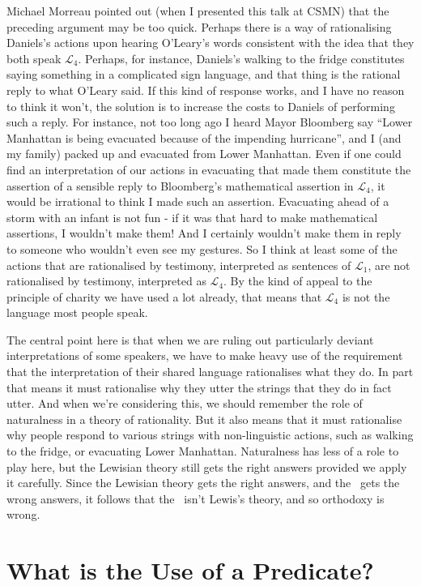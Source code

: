 Michael Morreau pointed out (when I presented this talk at CSMN) that the preceding argument may be too quick. Perhaps there is a way of rationalising Daniels's actions upon hearing O'Leary's words consistent with the idea that they both speak $\mathcal{L}_4$. Perhaps, for instance, Daniels's walking to the fridge constitutes saying something in a complicated sign language, and that thing is the rational reply to what O'Leary said. If this kind of response works, and I have no reason to think it won't, the solution is to increase the costs to Daniels of performing such a reply. For instance, not too long ago I heard Mayor Bloomberg say ``Lower Manhattan is being evacuated because of the impending hurricane'', and I (and my family) packed up and evacuated from Lower Manhattan. Even if one could find an interpretation of our actions in evacuating that made them constitute the assertion of a sensible reply to Bloomberg's mathematical assertion in $\mathcal{L}_4$, it would be irrational to think I made such an assertion. Evacuating ahead of a storm with an infant is not fun - if it was that hard to make mathematical assertions, I wouldn't make them! And I certainly wouldn't make them in reply to someone who wouldn't even see my gestures. So I think at least some of the actions that are rationalised by testimony, interpreted as sentences of $\mathcal{L}_1$, are not rationalised by testimony, interpreted as $\mathcal{L}_4$. By the kind of appeal to the principle of charity we have used a lot already, that means that $\mathcal{L}_4$ is not the language most people speak.

The central point here is that when we are ruling out particularly deviant interpretations of some speakers, we have to make heavy use of the requirement that the interpretation of their shared language rationalises what they do. In part that means it must rationalise why they utter the strings that they do in fact utter. And when we're considering this, we should remember the role of naturalness in a theory of rationality. But it also means that it must rationalise why people respond to various strings with non-linguistic actions, such as walking to the fridge, or evacuating Lower Manhattan. Naturalness has less of a role to play here, but the Lewisian theory still gets the right answers provided we apply it carefully. Since the Lewisian theory gets the right answers, and the \UNT\ gets the wrong answers, it follows that the \UNT\ isn't Lewis's theory, and so orthodoxy is wrong.

\section{What is the Use of a Predicate?}

